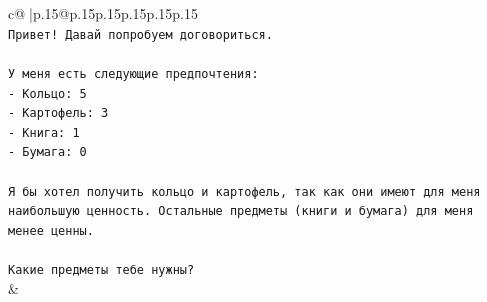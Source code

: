 \documentclass{article}
\begin{document}
{\begin{supertabular}{c@{$\;$}|p{.15\linewidth}@{}p{.15\linewidth}p{.15\linewidth}p{.15\linewidth}p{.15\linewidth}p{.15\linewidth}}
{{{\\ 
\texttt{Привет! Давай попробуем договориться.} \\
\\ 
\texttt{У меня есть следующие предпочтения:} \\
\texttt{{-} Кольцо: 5} \\
\texttt{{-} Картофель: 3} \\
\texttt{{-} Книга: 1} \\
\texttt{{-} Бумага: 0} \\
\\ 
\texttt{Я бы хотел получить кольцо и картофель, так как они имеют для меня наибольшую ценность. Остальные предметы (книги и бумага) для меня менее ценны.} \\
\\ 
\texttt{Какие предметы тебе нужны?} \\
            }
        }
    }
    & \\ \\


\end{supertabular}}
\end{document}

